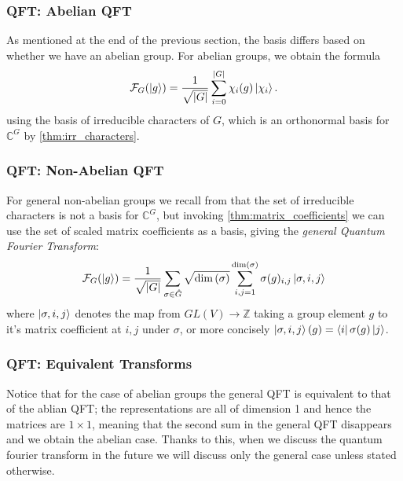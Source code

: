 \documentclass{beamer}
\renewcommand{\bra}{\Bra}
\renewcommand{\ket}{\Ket}
\renewcommand{\bra}{\Bra}
\renewcommand{\ket}{\Ket}
\newcommand{\abs}[1]{\left\lvert #1 \right\rvert}
\renewcommand{\dim}[1]{\textnormal{dim}\left(#1\right)}
\newcommand{\bb}[1]{\mathbb{#1}}
\renewcommand{\cal}[1]{\mathcal{#1}}
\begin{document}
\begin{frame}
\frametitle{QFT: Abelian QFT}
        As mentioned at the end of the previous section, the basis differs based on whether we have an abelian group.
        For abelian groups, we obtain the formula
        \begin{equation}\label{def:abelian_QFT}
            \cal{F}_G(\ket{g}) = \frac{1}{\sqrt{\abs{G}}} \sum_{i=0}^{\abs{G}} \chi_i(g) \ket{\chi_i}.
        \end{equation}
        using the basis of irreducible characters of $G$, which is an orthonormal basis for $\bb{C}^G$ by \ref{thm:irr_characters}.
\end{frame}

\begin{frame}
\frametitle{QFT: Non-Abelian QFT}
        For general non-abelian groups we recall from that the set of irreducible characters is not a basis for $\bb{C}^G$, but invoking \ref{thm:matrix_coefficients} we can use the set of scaled matrix coefficients as a basis, giving the \textit{general Quantum Fourier Transform}:
        \begin{equation}\label{def:general_QFT}
        \cal{F}_G(\ket{g}) = \frac{1}{\sqrt{\abs{G}}} \sum_{\sigma \in \hat{G}} \sqrt{\dim{\sigma}} \sum_{i,j = 1}^{\dim{\sigma}} \sigma(g)_{i,j} \ket{\sigma, i, j}
        \end{equation}
        where $\ket{\sigma, i, j}$ denotes the map from $GL(V) \to \bb{Z}$ taking a group element $g$ to it's matrix coefficient at $i, j$ under $\sigma$, or more concisely $\ket{\sigma, i, j}(g) = \bra{i}\sigma(g) \ket{j}$.
\end{frame}

\begin{frame}
\frametitle{QFT: Equivalent Transforms}
        Notice that for the case of abelian groups the general QFT is equivalent to that of the ablian QFT; the representations are all of dimension 1 and hence the matrices are $1 \times 1$, meaning that the second sum in the general QFT disappears and we obtain the abelian case.
        Thanks to this, when we discuss the quantum fourier transform in the future we will discuss only the general case unless stated otherwise.
\end{frame}
\end{document}
